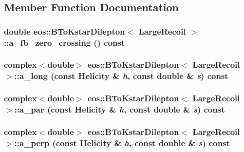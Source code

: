 \subsection{Member Function Documentation}
\hypertarget{classeos_1_1BToKstarDilepton_3_01LargeRecoil_01_4_a2dfa00f4a78916bc1206467e50cbba84}{
\subsubsection[{a\_\-fb\_\-zero\_\-crossing}]{\setlength{\rightskip}{0pt plus 5cm}double eos::BToKstarDilepton$<$ {\bf LargeRecoil} $>$::a\_\-fb\_\-zero\_\-crossing () const}}
\label{classeos_1_1BToKstarDilepton_3_01LargeRecoil_01_4_a2dfa00f4a78916bc1206467e50cbba84}
\hypertarget{classeos_1_1BToKstarDilepton_3_01LargeRecoil_01_4_ac7dceafd65b31380d2a1e6009e6d6202}{
\subsubsection[{a\_\-long}]{\setlength{\rightskip}{0pt plus 5cm}complex$<$double$>$ eos::BToKstarDilepton$<$ {\bf LargeRecoil} $>$::a\_\-long (const {\bf Helicity} \& {\em h}, \/  const double \& {\em s}) const}}
\label{classeos_1_1BToKstarDilepton_3_01LargeRecoil_01_4_ac7dceafd65b31380d2a1e6009e6d6202}
\hypertarget{classeos_1_1BToKstarDilepton_3_01LargeRecoil_01_4_a5189131b39ddfac57b129af1bee7374c}{
\subsubsection[{a\_\-par}]{\setlength{\rightskip}{0pt plus 5cm}complex$<$double$>$ eos::BToKstarDilepton$<$ {\bf LargeRecoil} $>$::a\_\-par (const {\bf Helicity} \& {\em h}, \/  const double \& {\em s}) const}}
\label{classeos_1_1BToKstarDilepton_3_01LargeRecoil_01_4_a5189131b39ddfac57b129af1bee7374c}
\hypertarget{classeos_1_1BToKstarDilepton_3_01LargeRecoil_01_4_a0d7d954b551e4aeb7e4ed7a77df69910}{
\subsubsection[{a\_\-perp}]{\setlength{\rightskip}{0pt plus 5cm}complex$<$double$>$ eos::BToKstarDilepton$<$ {\bf LargeRecoil} $>$::a\_\-perp (const {\bf Helicity} \& {\em h}, \/  const double \& {\em s}) const}}
